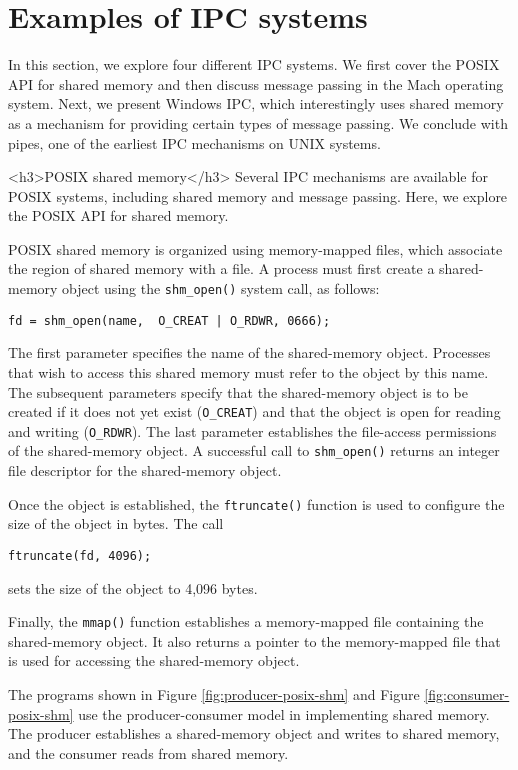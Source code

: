 \section{Examples of IPC systems}\label{sec:3.7}

In this section, we explore four different IPC systems. We first cover the POSIX API for shared memory and then discuss message passing in the Mach operating system. Next, we present Windows IPC, which interestingly uses shared memory as a mechanism for providing certain types of message passing. We conclude with pipes, one of the earliest IPC mechanisms on UNIX systems.

<h3>POSIX shared memory</h3>
Several IPC mechanisms are available for POSIX systems, including shared memory and message passing. Here, we explore the POSIX API for shared memory.

POSIX shared memory is organized using memory-mapped files, which associate the region of shared memory with a file. A process must first create a shared-memory object using the \texttt{shm\_open()} system call, as follows:
\begin{verbatim}
fd = shm_open(name,  O_CREAT | O_RDWR, 0666);
\end{verbatim}
The first parameter specifies the name of the shared-memory object. Processes that wish to access this shared memory must refer to the object by this name. The subsequent parameters specify that the shared-memory object is to be created if it does not yet exist (\texttt{O\_CREAT}) and that the object is open for reading and writing (\texttt{O\_RDWR}). The last parameter establishes the file-access permissions of the shared-memory object. A successful call to \texttt{shm\_open()} returns an integer file descriptor for the shared-memory object.

Once the object is established, the \texttt{ftruncate()} function is used to configure the size of the object in bytes. The call
\begin{verbatim}
ftruncate(fd, 4096);
\end{verbatim}
sets the size of the object to 4,096 bytes.

Finally, the \texttt{mmap()} function establishes a memory-mapped file containing the shared-memory object. It also returns a pointer to the memory-mapped file that is used for accessing the shared-memory object.

The programs shown in Figure \ref{fig:producer-posix-shm} and Figure \ref{fig:consumer-posix-shm} use the producer-consumer model in implementing shared memory. The producer establishes a shared-memory object and writes to shared memory, and the consumer reads from shared memory.


